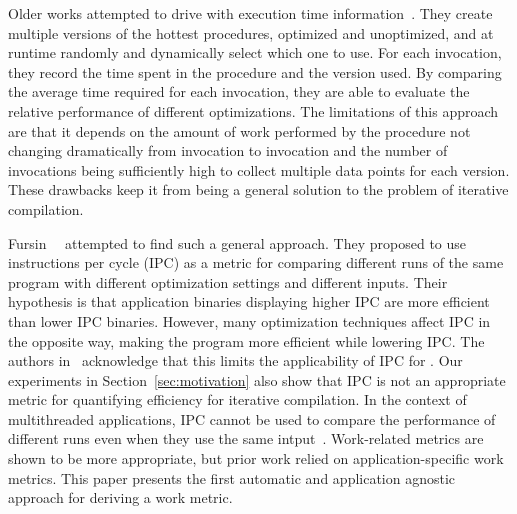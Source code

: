 Older works attempted to drive \itercomp with execution time information~\cite{fursin:hal-01257279,fursin:inria-00001054}. They create
multiple versions of the hottest procedures, optimized and unoptimized, and at runtime randomly and dynamically select which one to use.
For each invocation, they record the time spent in the procedure and the version used. By comparing the average time required for each
invocation, they are able to evaluate the relative performance of different optimizations. The limitations of this approach are that it
depends on the amount of work performed by the procedure not changing dramatically from invocation to invocation and the number of
invocations being sufficiently high to collect multiple data points for each version. These drawbacks keep it from being a general solution
to the problem of iterative compilation.

Fursin~\etal~\cite{fursin07} attempted to find such a general approach. They proposed to use instructions per cycle (IPC)
as a metric for comparing different runs of the same program with different optimization settings and different inputs. Their hypothesis is
that application binaries displaying higher IPC are more efficient than lower IPC binaries. However, many optimization techniques affect
IPC in the opposite way, making the program more efficient while lowering IPC. The authors in~\cite{fursin07} acknowledge that this limits
the applicability of IPC for \itercomp. Our experiments in Section~\ref{sec:motivation} also show that IPC is not an appropriate metric
for quantifying efficiency for iterative compilation. In the context of multithreaded applications, IPC cannot be used to compare the performance of
different runs even when they use the same intput~\cite{alameldeen06,eyerman08}. Work-related metrics are shown to be more appropriate, but prior work
relied on application-specific work metrics. This paper presents the first automatic and application agnostic approach for deriving a work metric.





